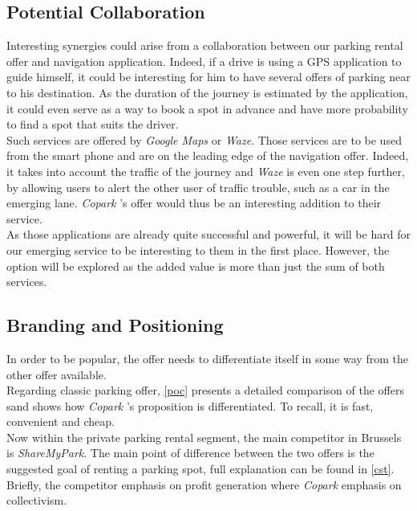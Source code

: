 \documentclass[12pt,a4paper,oneside]{book}
\newcommand{\bp}{\textit{Copark }}
\begin{document}
\subsection{Potential Collaboration}
Interesting synergies could arise from a collaboration between our parking rental offer and navigation application. Indeed, if a drive is using a GPS application to guide himself, it could be interesting for him to have several offers of parking near to his destination. As the duration of the journey is estimated by the application, it could even serve as a way to book a spot in advance and have more probability to find a spot that suits the driver.\\
Such services are offered by \textit{Google Maps} or \textit{Waze}. Those services are to be used from the smart phone and are on the leading edge of the navigation offer. Indeed, it takes into account the traffic of the journey and \textit{Waze} is even one step further, by allowing users to alert the other user of traffic trouble, such as a car in the emerging lane. \bp's offer would thus be an interesting addition to their service.\\
As those applications are already quite successful and powerful, it will be hard for our emerging service to be interesting to them in the first place. However, the option will be explored as the added value is more than just the sum of both services.

\subsection{Branding and Positioning}

In order to be popular, the offer needs to differentiate itself in some way from the other offer available.\\

Regarding classic parking offer, \autoref{poc} presents a detailed comparison of the offers sand shows how \bp's proposition is differentiated. To recall, it is fast, convenient and cheap.\\

Now within the private parking rental segment, the main competitor in Brussels is \textit{ShareMyPark}. The main point of difference between the two offers is the suggested goal of renting a parking spot, full explanation can be found in \autoref{cst}. Briefly, the competitor emphasis on profit generation where \bp emphasis on collectivism.\\
\end{document}
